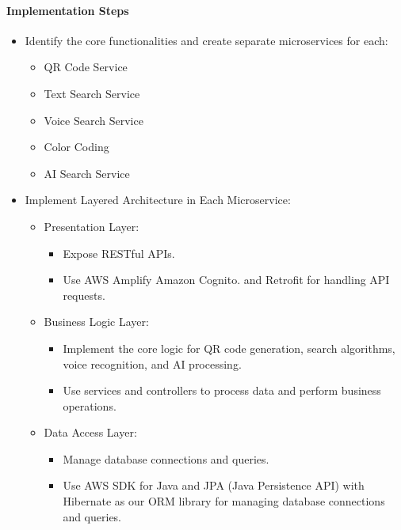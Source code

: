 \documentclass[hidelinks, 12pt, a4paper]{article}
\begin{document}
\begin{itemize}
    \paragraph{Implementation Steps}
    \begin{itemize}
        \item Identify the core functionalities and create separate microservices for each:
        \begin{itemize}
            \item QR Code Service
            \item Text Search Service
            \item Voice Search Service
            \item Color Coding
            \item AI Search Service
        \end{itemize}
        \item Implement Layered Architecture in Each Microservice:
        \begin{itemize}
            \item Presentation Layer:
            \begin{itemize}
                \item Expose RESTful APIs.
                \item Use AWS Amplify Amazon Cognito. and Retrofit for handling API requests.
            \end{itemize}
            \item Business Logic Layer:
            \begin{itemize}
                \item Implement the core logic for QR code generation, search algorithms, voice recognition, and AI processing.
                \item Use services and controllers to process data and perform business operations.
            \end{itemize}
            \item Data Access Layer:
            \begin{itemize}
                \item Manage database connections and queries.
                \item Use AWS SDK for Java and JPA (Java Persistence API) with Hibernate as our ORM library for managing database connections and queries.
            \end{itemize}
        \end{itemize}
    \end{itemize}

\end{itemize}
\end{document}
